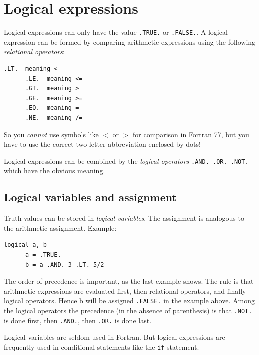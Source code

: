 \chapter{Logical expressions}

Logical expressions can only have the value \texttt{.TRUE.} or \texttt{.FALSE.}. A logical expression can be formed by comparing arithmetic expressions using the following \emph{relational operators}:

\begin{lstlisting}[style=fortran77]
      .LT.  meaning <
      .LE.  meaning <=
      .GT.  meaning >
      .GE.  meaning >=
      .EQ.  meaning =
      .NE.  meaning /=
\end{lstlisting}

So you \emph{cannot} use symbols like $<$ or $>$ for comparison in Fortran 77, but you have to use the correct two-letter abbreviation enclosed by dots!

Logical expressions can be combined by the \emph{logical operators} \texttt{.AND. .OR. .NOT.} which have the obvious meaning.

\section{Logical variables and assignment}

Truth values can be stored in \emph{logical variables}. The assignment is analogous to the arithmetic assignment. Example:

\begin{lstlisting}[style=fortran77]
      logical a, b
      a = .TRUE.
      b = a .AND. 3 .LT. 5/2
\end{lstlisting}

The order of precedence is important, as the last example shows. The rule is that arithmetic expressions are evaluated first, then relational operators, and finally logical operators. Hence b will be assigned \texttt{.FALSE.} in the example above. Among the logical operators the precedence (in the absence of parenthesis) is that \texttt{.NOT.} is done first, then \texttt{.AND.}, then \texttt{.OR.} is done last.

Logical variables are seldom used in Fortran. But logical expressions are frequently used in conditional statements like the \texttt{if} statement.
